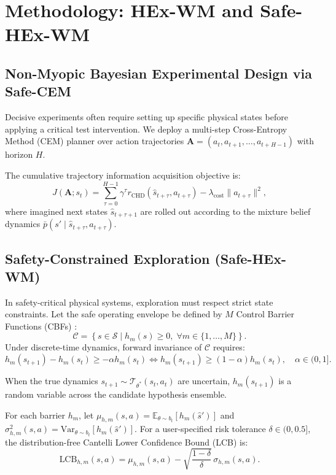 \section{Methodology: HEx-WM and Safe-HEx-WM}
\label{sec:method}

\subsection{Non-Myopic Bayesian Experimental Design via Safe-CEM}
Decisive experiments often require setting up specific physical states before applying a critical test intervention. We deploy a multi-step Cross-Entropy Method (CEM) planner over action trajectories $\mathbf{A} = (a_t, a_{t+1}, \dots, a_{t+H-1})$ with horizon $H$.

The cumulative trajectory information acquisition objective is:
\begin{equation}
    J(\mathbf{A}; s_t) = \sum_{\tau=0}^{H-1} \gamma^\tau r_{\text{CHD}}(\hat{s}_{t+\tau}, a_{t+\tau}) - \lambda_{\text{cost}} \|a_{t+\tau}\|^2,
\end{equation}
where imagined next states $\hat{s}_{t+\tau+1}$ are rolled out according to the mixture belief dynamics $\bar{p}(s' \mid \hat{s}_{t+\tau}, a_{t+\tau})$.

\subsection{Safety-Constrained Exploration (Safe-HEx-WM)}
In safety-critical physical systems, exploration must respect strict state constraints. Let the safe operating envelope be defined by $M$ Control Barrier Functions (CBFs) \citep{ames2019control}:
\begin{equation}
    \mathcal{C} = \left\{ s \in \mathcal{S} \;\Big|\; h_m(s) \ge 0, \; \forall m \in \{1, \dots, M\} \right\}.
\end{equation}
Under discrete-time dynamics, forward invariance of $\mathcal{C}$ requires:
\begin{equation}
    h_m(s_{t+1}) - h_m(s_t) \ge -\alpha h_m(s_t) \iff h_m(s_{t+1}) \ge (1 - \alpha) h_m(s_t), \quad \alpha \in (0, 1].
\end{equation}

When the true dynamics $s_{t+1} \sim \mathcal{T}_{\theta^*}(s_t, a_t)$ are uncertain, $h_m(s_{t+1})$ is a random variable across the candidate hypothesis ensemble.

\begin{definition}
For each barrier $h_m$, let $\mu_{h, m}(s, a) = \mathbb{E}_{\theta \sim b_t}[h_m(\hat{s}')]$ and $\sigma_{h, m}^2(s, a) = \text{Var}_{\theta \sim b_t}[h_m(\hat{s}')]$. For a user-specified risk tolerance $\delta \in (0, 0.5]$, the distribution-free Cantelli Lower Confidence Bound (LCB) is:
\begin{equation}
    \text{LCB}_{h, m}(s, a) = \mu_{h, m}(s, a) - \sqrt{\frac{1 - \delta}{\delta}} \, \sigma_{h, m}(s, a).
\end{equation}
\end{definition}

